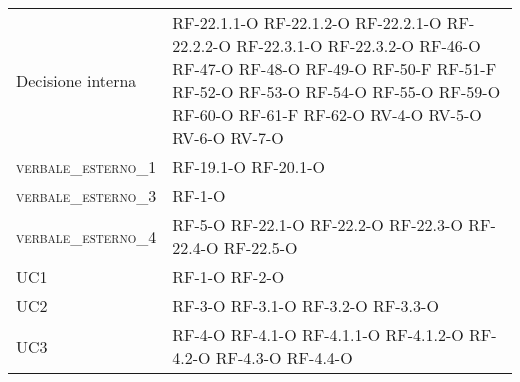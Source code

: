 \begin{longtable}{ 
		>{}p{} 
		>{}p{} }
Decisione interna &
RF-22.1.1-O \newline
RF-22.1.2-O \newline
RF-22.2.1-O \newline 
RF-22.2.2-O \newline
RF-22.3.1-O \newline
RF-22.3.2-O \newline
RF-46-O \newline
RF-47-O \newline
RF-48-O \newline
RF-49-O \newline
RF-50-F \newline
RF-51-F \newline
RF-52-O \newline
RF-53-O \newline
RF-54-O \newline
RF-55-O \newline
RF-59-O \newline
RF-60-O \newline
RF-61-F \newline
RF-62-O \newline
RV-4-O \newline
RV-5-O \newline
RV-6-O \newline
RV-7-O
\tabularnewline
	
\textsc{verbale\_esterno\_1} &
	RF-19.1-O	\newline
	RF-20.1-O	
	\tabularnewline

\textsc{verbale\_esterno\_3} &
	RF-1-O
	\tabularnewline

\textsc{verbale\_esterno\_4} &
	RF-5-O	\newline
	RF-22.1-O\newline
	RF-22.2-O\newline
	RF-22.3-O\newline
	RF-22.4-O\newline
	RF-22.5-O	
	\tabularnewline
		
UC1 &
	RF-1-O	\newline
	RF-2-O	\tabularnewline
	
UC2 &
	RF-3-O \newline
	RF-3.1-O \newline
	RF-3.2-O \newline
	RF-3.3-O \newline
\tabularnewline
	
UC3 &
RF-4-O \newline
RF-4.1-O \newline
RF-4.1.1-O \newline
RF-4.1.2-O \newline
RF-4.2-O \newline
RF-4.3-O \newline
RF-4.4-O
\tabularnewline


\end{longtable}
